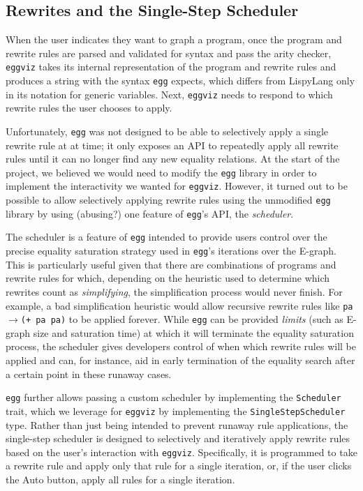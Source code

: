 \documentclass[letterpaper,twocolumn,11pt]{article}
\begin{document}
\subsection{Rewrites and the Single-Step Scheduler}

When the user indicates they want to graph a program, once the program and
rewrite rules are parsed and validated for syntax and pass the arity checker,
\texttt{eggviz} takes its internal representation of the program and rewrite
rules and produces a string with the syntax \texttt{egg} expects, which differs
from LispyLang only in its notation for generic variables. Next, \texttt{eggviz}
needs to respond to which rewrite rules the user chooses to apply.

Unfortunately, \texttt{egg} was not designed to be able to selectively apply a
single rewrite rule at at time; it only exposes an API to repeatedly apply all
rewrite rules until it can no longer find any new equality relations. At the
start of the project, we believed we would need to modify the \texttt{egg}
library in order to implement the interactivity we wanted for
\texttt{eggviz}. However, it turned out to be possible to allow selectively
applying rewrite rules using the unmodified \texttt{egg} library by using
(abusing?) one feature of \texttt{egg}'s API, the \textit{scheduler}.

The scheduler is a feature of \texttt{egg} intended to provide users control
over the precise equality saturation strategy used in \texttt{egg}'s iterations
over the E-graph. This is particularly useful given that there are combinations
of programs and rewrite rules for which, depending on the heuristic used to
determine which rewrites count as \textit{simplifying}, the simplification
process would never finish. For example, a bad simplification heuristic would
allow recursive rewrite rules like \texttt{pa}$\rightarrow$\texttt{(+ pa pa)} to
be applied forever. While \texttt{egg} can be provided \textit{limits} (such as
E-graph size and saturation time) at which it will terminate the equality
saturation process, the scheduler gives developers control of when which rewrite
rules will be applied and can, for instance, aid in early termination of the
equality search after a certain point in these runaway cases.

\texttt{egg} further allows passing a custom scheduler by implementing the
\texttt{Scheduler} trait, which we leverage for \texttt{eggviz} by implementing
the \texttt{SingleStepScheduler} type. Rather than just being intended to
prevent runaway rule applications, the single-step scheduler is designed to
selectively and iteratively apply rewrite rules based on the user's interaction
with \texttt{eggviz}. Specifically, it is programmed to take a rewrite rule and
apply only that rule for a single iteration, or, if the user clicks the Auto
button, apply all rules for a single iteration.
\end{document}
